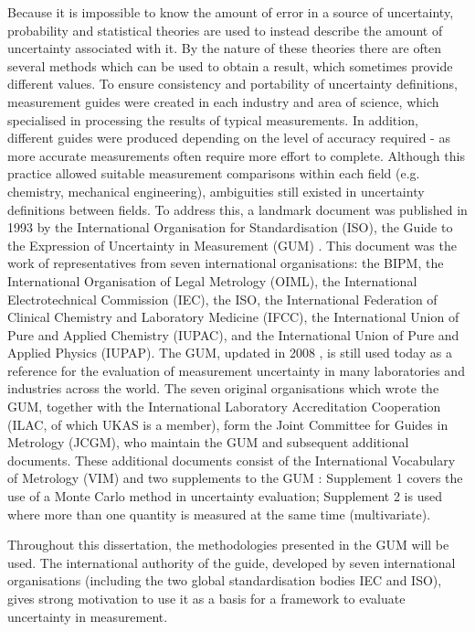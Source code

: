 \documentclass[../thesis/thesis.tex]{subfiles}
\begin{document}
Because it is impossible to know the amount of error in a source of uncertainty, probability and statistical theories are used to instead describe the amount of uncertainty associated with it. By the nature of these theories there are often several methods which can be used to obtain a result, which sometimes provide different values. To ensure consistency and portability of uncertainty definitions, measurement guides were created in each industry and area of science, which specialised in processing the results of typical measurements. In addition, different guides were produced depending on the level of accuracy required - as more accurate measurements often require more effort to complete. Although this practice allowed suitable measurement comparisons within each field (e.g. chemistry, mechanical engineering), ambiguities still existed in uncertainty definitions between fields. To address this, a landmark document was published in 1993 by the International Organisation for Standardisation (ISO), the Guide to the Expression of Uncertainty in Measurement (GUM) \cite{GUM_1993}. This document was the work of representatives from seven international organisations: the BIPM, the International Organisation of Legal Metrology (OIML), the International Electrotechnical Commission (IEC), the ISO, the International Federation of Clinical Chemistry and Laboratory Medicine (IFCC), the International Union of Pure and Applied Chemistry (IUPAC), and the International Union of Pure and Applied Physics (IUPAP). The GUM, updated in 2008 \cite{GUM_2008}, is still used today as a reference for the evaluation of measurement uncertainty in many laboratories and industries across the world. The seven original organisations which wrote the GUM, together with the International Laboratory Accreditation Cooperation (ILAC, of which UKAS is a member), form the Joint Committee for Guides in Metrology (JCGM), who maintain the GUM and subsequent additional documents. These additional documents consist of the International Vocabulary of Metrology (VIM) \cite{VIM} and two supplements to the GUM \cite{GUM_S1,GUM_S2}: Supplement 1 covers the use of a Monte Carlo method \cite{Metropolis_1949} in uncertainty evaluation; Supplement 2 is used where more than one quantity is measured at the same time (multivariate).

Throughout this dissertation, the methodologies presented in the GUM will be used. The international authority of the guide, developed by seven international organisations (including the two global standardisation bodies IEC and ISO), gives strong motivation to use it as a basis for a framework to evaluate uncertainty in measurement.
\end{document}
